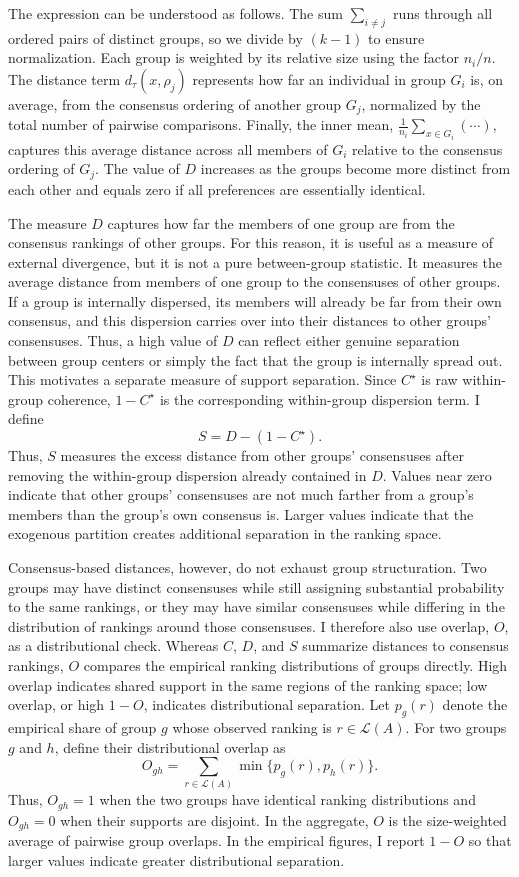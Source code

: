 \documentclass[12pt]{article}
\begin{document}
The expression can be understood as follows. The sum \(\sum_{i \neq j}\) runs
through all ordered pairs of distinct groups, so we divide by \((k-1)\) to
ensure normalization. Each group is weighted by its relative size using the
factor \( n_i / n \). The distance term \( d_{\tau}(x, \rho_j) \) represents how
far an individual in group \( G_i \) is, on average, from the consensus ordering
of another group \( G_j \), normalized by the total number of pairwise
comparisons. Finally, the inner mean,
\( \frac{1}{n_i}\sum_{x \in G_i}(\cdots) \), captures this average distance
across all members of \( G_i \) relative to the consensus ordering of \( G_j \).
The value of \( D \) increases as the groups become more distinct from each
other and equals zero if all preferences are essentially identical.


The measure \(D\) captures how far the members of one group are from the consensus rankings of other groups. For this reason, it is useful as a measure of external divergence, but it is not a pure between-group statistic. It measures the average distance from members of one group to the consensuses of other groups. If a group is internally dispersed, its members will already be far from their own consensus, and this dispersion carries over into their distances to other groups' consensuses. Thus, a high value of \(D\) can reflect either genuine separation between group centers or simply the fact that the group is internally spread out. This motivates a separate measure of support separation. Since \(C^{\star}\) is raw within-group coherence, \(1-C^{\star}\) is the corresponding within-group dispersion term. I define
\[
S = D - (1-C^{\star}).
\]
Thus, \(S\) measures the excess distance from other groups' consensuses after removing the within-group dispersion already contained in \(D\). Values near zero indicate that other groups' consensuses are not much farther from a group's members than the group's own consensus is. Larger values indicate that the exogenous partition creates additional separation in the ranking space.

Consensus-based distances, however, do not exhaust group structuration. Two
groups may have distinct consensuses while still assigning substantial
probability to the same rankings, or they may have similar consensuses while
differing in the distribution of rankings around those consensuses. I therefore
also use overlap, \(O\), as a distributional check. Whereas \(C\), \(D\), and
\(S\) summarize distances to consensus rankings, \(O\) compares the empirical
ranking distributions of groups directly. High overlap indicates shared support
in the same regions of the ranking space; low overlap, or high \(1-O\),
indicates distributional separation. Let \(p_g(r)\) denote the empirical share
of group \(g\) whose observed ranking is \(r \in \mathcal L(A)\). For two groups
\(g\) and \(h\), define their distributional overlap as \[ O_{gh} = \sum_{r \in \mathcal
L(A)} \min\{p_g(r),p_h(r)\}. \] Thus, \(O_{gh}=1\) when the two groups have
identical ranking distributions and \(O_{gh}=0\) when their supports are disjoint.
In the aggregate, \(O\) is the size-weighted average of pairwise group overlaps.
In the empirical figures, I report \(1-O\) so that larger values indicate
greater distributional separation.
\end{document}

